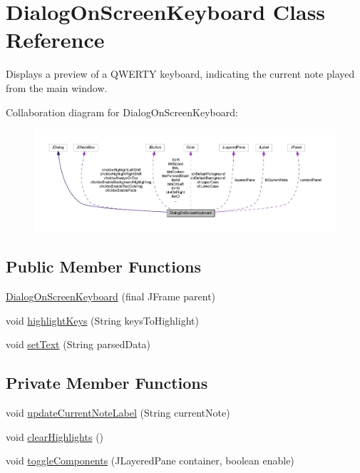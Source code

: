 \hypertarget{classcom_1_1lclion_1_1midigui_1_1_dialog_on_screen_keyboard}{\section{Dialog\+On\+Screen\+Keyboard Class Reference}
\label{classcom_1_1lclion_1_1midigui_1_1_dialog_on_screen_keyboard}
}


Displays a preview of a Q\+W\+E\+R\+T\+Y keyboard, indicating the current note played from the main window.  




Collaboration diagram for Dialog\+On\+Screen\+Keyboard\+:\nopagebreak
\begin{figure}[H]
\begin{center}
\leavevmode
\includegraphics[width=350pt]{classcom_1_1lclion_1_1midigui_1_1_dialog_on_screen_keyboard__coll__graph}
\end{center}
\end{figure}
\subsection*{Public Member Functions}
\begin{DoxyCompactItemize}
\item 
\hyperlink{classcom_1_1lclion_1_1midigui_1_1_dialog_on_screen_keyboard_ac5f684ded8b7d9c9bb8f3fef7d5f6ebc}{Dialog\+On\+Screen\+Keyboard} (final J\+Frame parent)
\item 
void \hyperlink{classcom_1_1lclion_1_1midigui_1_1_dialog_on_screen_keyboard_ae11e61d422e0ffcfde71c2c8d22e8125}{highlight\+Keys} (String keys\+To\+Highlight)
\item 
void \hyperlink{classcom_1_1lclion_1_1midigui_1_1_dialog_on_screen_keyboard_aa6b620d240a70e879d6c4c94c2cddadf}{set\+Text} (String parsed\+Data)
\end{DoxyCompactItemize}
\subsection*{Private Member Functions}
\begin{DoxyCompactItemize}
\item 
void \hyperlink{classcom_1_1lclion_1_1midigui_1_1_dialog_on_screen_keyboard_ae91f8f91ce33c821d70b3d5e09c08cc7}{update\+Current\+Note\+Label} (String current\+Note)
\item 
void \hyperlink{classcom_1_1lclion_1_1midigui_1_1_dialog_on_screen_keyboard_ae2176f8320d6a67ec81ce53e3b0df321}{clear\+Highlights} ()
\item 
void \hyperlink{classcom_1_1lclion_1_1midigui_1_1_dialog_on_screen_keyboard_a8bb16dd8ea1ccc12b8032d397ab8b3e9}{toggle\+Components} (J\+Layered\+Pane container, boolean enable)
\end{DoxyCompactItemize}
